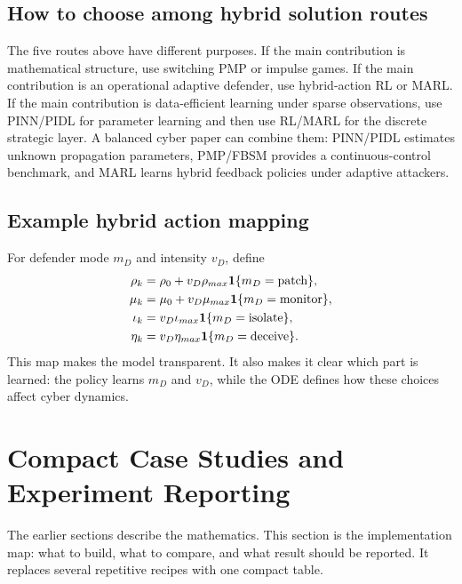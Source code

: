\documentclass[11pt,a4paper]{article}
\begin{document}
\subsection{How to choose among hybrid solution routes}
The five routes above have different purposes. If the main contribution is mathematical structure, use switching PMP or impulse games. If the main contribution is an operational adaptive defender, use hybrid-action RL or MARL. If the main contribution is data-efficient learning under sparse observations, use PINN/PIDL for parameter learning and then use RL/MARL for the discrete strategic layer. A balanced cyber paper can combine them: PINN/PIDL estimates unknown propagation parameters, PMP/FBSM provides a continuous-control benchmark, and MARL learns hybrid feedback policies under adaptive attackers.

\subsection{Example hybrid action mapping}
For defender mode $m_D$ and intensity $v_D$, define
\begin{align}
\rho_k &= \rho_0+v_D\rho_{max}\mathbf{1}\{m_D=\text{patch}\},\\
\mu_k &= \mu_0+v_D\mu_{max}\mathbf{1}\{m_D=\text{monitor}\},\\
\iota_k &= v_D\iota_{max}\mathbf{1}\{m_D=\text{isolate}\},\\
\eta_k &= v_D\eta_{max}\mathbf{1}\{m_D=\text{deceive}\}.
\end{align}
This map makes the model transparent. It also makes it clear which part is learned: the policy learns $m_D$ and $v_D$, while the ODE defines how these choices affect cyber dynamics.

\section{Compact Case Studies and Experiment Reporting}
The earlier sections describe the mathematics. This section is the implementation map: what to build, what to compare, and what result should be reported. It replaces several repetitive recipes with one compact table.
\end{document}
